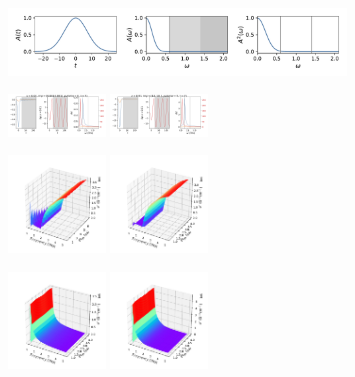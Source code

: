 \documentclass[a4paper]{article}
\begin{document}
\begin{figure}[H]
  \centering
  \includegraphics[width=0.8\textwidth]{A1.pdf}
\end{figure}
\begin{figure}[H]
  \centering
  \includegraphics[width=0.23\textwidth]{HL-A1-v1-imp0.pdf}
  \includegraphics[width=0.23\textwidth]{HL-A1-v1-imp3.pdf}
\end{figure}
\begin{figure}[H]
  \centering
  \includegraphics[width=0.23\textwidth]{cond3d_real-A1-v1-imp0.pdf}
  \includegraphics[width=0.23\textwidth]{cond3d_real-A1-v1-imp3.pdf}
\end{figure}
\begin{figure}[H]
  \centering
  \includegraphics[width=0.23\textwidth]{cond3d_imag-A1-v1-imp0.pdf}
  \includegraphics[width=0.23\textwidth]{cond3d_imag-A1-v1-imp3.pdf}
\end{figure}
\end{document}
